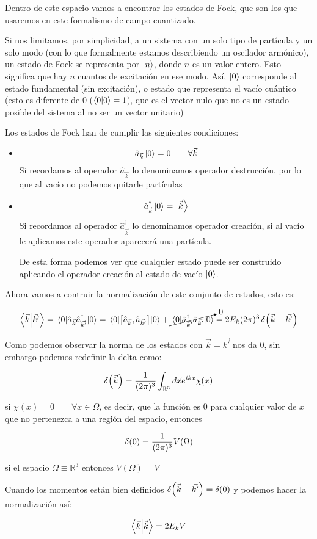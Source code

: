 Dentro de este espacio vamos a encontrar los estados de Fock, que son los que usaremos en este formalismo de campo cuantizado. 

\begin{definition}
  Si nos limitamos, por simplicidad, a un sistema con un solo tipo de partícula y un solo modo (con lo que formalmente estamos describiendo un oscilador armónico), un estado de Fock se representa por $\ket{n}$, donde $n$ es un valor entero. Esto significa que hay $n$ cuantos de excitación en ese modo. Así, $\ket{0}$ corresponde al estado fundamental (sin excitación), o estado que representa el vacío cuántico (esto es diferente de 0 ($\braket{0}=1$), que es el vector nulo que no es un estado posible del sistema al no ser un vector unitario)
\end{definition}

Los estados de Fock han de cumplir las siguientes condiciones:
\begin{itemize}
  \item \[\hat{a}_{\vec{k}}\ket{0}=0 \qquad \forall \vec{k}\]
  Si recordamos al operador $\hat{a}_{\vec{k}}$ lo denominamos operador destrucción, por lo que al vacío no podemos quitarle partículas
  \item \[\hat{a}^{\dagger}_{\vec{k}}\ket{0}=\ket{\vec{k}}\]
  Si recordamos al operador $\hat{a}^{\dagger}_{\vec{k}}$ lo denominamos operador creación, si al vacío le aplicamos este operador aparecerá una partícula.

  De esta forma podemos ver que cualquier estado puede ser construido aplicando el operador creación al estado de vacío $\ket{0}$. 
\end{itemize}

Ahora vamos a contruir la normalización de este conjunto de estados, esto es:

\[\braket{\vec{k}}{\vec{k'}}= \ev{\hat{a}_{\vec{k}}\hat{a}^{\dagger}_{\vec{k'}}}{0}=\ev{\comm{\hat{a}_{\vec{k}}}{\hat{a}_{\vec{k'}}}}{0}+\cancelto{0}{\ev{\hat{a}^{\dagger}_{\vec{k'}}\hat{a}_{\vec{k'}}}{0}}=2E_{k}(2\pi)^{3} \var(\vec{k}-\vec{k'})\]

\begin{remark}
Como podemos observar la norma de los estados con $\vec{k}=\vec{k'}$ nos da 0, sin embargo podemos redefinir la delta como: 

\[\var(\vec{k})=\frac{1}{(2\pi)^{3}}\int_{\mathbb{R}^{3}}d \vec{x}e^{ikx}\chi(x)\]

si $\chi(x)=0\qquad\forall x\in\Omega$, es decir, que la función es 0 para cualquier valor de $x$ que no pertenezca a una región del espacio, entonces 

\[\var(0)=\frac{1}{(2\pi)^{3}}V(\Omega)\] 

si el espacio $\Omega \equiv \mathbb{R}^{3}$ entonces $V(\Omega)=V$

Cuando los momentos están bien definidos $\var(\vec{k}-\vec{k'})=\var(0)$ y podemos hacer la normalización así:

\[\braket{\vec{k}}=2E_{k}V\]

\end{remark}

